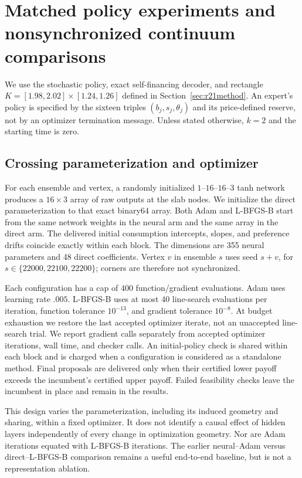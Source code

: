 \section{Matched policy experiments and nonsynchronized continuum comparisons}\label{sec:r22method}
We use the stochastic policy, exact self-financing decoder, and rectangle $K=[1.98,2.02]\times[1.24,1.26]$ defined in Section~\ref{sec:r21method}. An expert's policy is specified by the sixteen triples $(b_j,s_j,\theta_j)$ and its price-defined reserve, not by an optimizer termination message. Unless stated otherwise, $k=2$ and the starting time is zero.

\subsection{Crossing parameterization and optimizer}
For each ensemble and vertex, a randomly initialized $1$--$16$--$16$--$3$ tanh network produces a $16\times3$ array of raw outputs at the slab nodes. We initialize the direct parameterization to that exact binary64 array. Both Adam and L-BFGS-B start from the same network weights in the neural arm and the same array in the direct arm. The delivered initial consumption intercepts, slopes, and preference drifts coincide exactly within each block. The dimensions are 355 neural parameters and 48 direct coefficients. Vertex $v$ in ensemble $s$ uses seed $s+v$, for $s\in\{22000,22100,22200\}$; corners are therefore not synchronized.

Each configuration has a cap of 400 function/gradient evaluations. Adam uses learning rate $.005$. L-BFGS-B uses at most 40 line-search evaluations per iteration, function tolerance $10^{-13}$, and gradient tolerance $10^{-8}$. At budget exhaustion we restore the last accepted optimizer iterate, not an unaccepted line-search trial. We report gradient calls separately from accepted optimizer iterations, wall time, and checker calls. An initial-policy check is shared within each block and is charged when a configuration is considered as a standalone method. Final proposals are delivered only when their certified lower payoff exceeds the incumbent's certified upper payoff. Failed feasibility checks leave the incumbent in place and remain in the results.

This design varies the parameterization, including its induced geometry and sharing, within a fixed optimizer. It does not identify a causal effect of hidden layers independently of every change in optimization geometry. Nor are Adam iterations equated with L-BFGS-B iterations. The earlier neural--Adam versus direct--L-BFGS-B comparison remains a useful end-to-end baseline, but is not a representation ablation.


